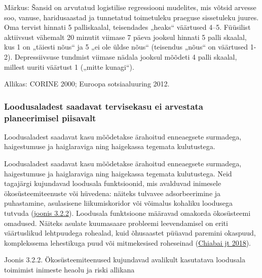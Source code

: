 \documentclass[estonian,]{article}
\begin{document}
\begin{figure-comment}
{Märkus:} Šansid on arvutatud logistilise regressiooni mudelites, mis
võtsid arvesse soo, vanuse, haridusaastad ja tunnetatud toimetuleku
praeguse sissetuleku juures. Oma tervist hinnati 5 palliskaalal,
teisendades „heaks`` väärtused 4--5. Füüsilist aktiivsust vähemalt 20
minutit viimase 7 päeva jooksul hinnati 5 palli skaalal, kus 1 on
„täiesti nõus`` ja 5 „ei ole üldse nõus`` (teisendus „nõus`` on
väärtused 1-2). Depressiivsuse tundmist viimase nädala jooksul mõõdeti 4
palli skaalal, millest uuriti väärtust 1 („mitte kunagi``).
\end{figure-comment}

\begin{imgsource}
{Allikas:} CORINE 2000; Euroopa sotsiaaluuring 2012.
\end{imgsource}

\hypertarget{loodusaladest-saadavat-tervisekasu-ei-arvestata-planeerimisel-piisavalt}{%
\subsubsection*{Loodusaladest saadavat tervisekasu ei arvestata planeerimisel piisavalt}\label{loodusaladest-saadavat-tervisekasu-ei-arvestata-planeerimisel-piisavalt}}

\begin{blockquote-left}
Loodusaladest saadavat kasu mõõdetakse ärahoitud enneaegsete surmadega,
haigestumuse ja haiglaraviga ning haigekassa tegemata kulutustega.
\end{blockquote-left}

Loodusaladest saadavat kasu mõõdetakse ärahoitud enneaegsete surmadega, haigestumuse ja haiglaraviga ning haigekassa tegemata kulutustega. Neid tagajärgi kujundavad loodusala funktsioonid, mis avalduvad inimesele ökosüsteemiteenuste või hüvedena: näiteks tulvavee adsorbeerimine ja puhastamine, asulasisene liikumiskoridor või võimalus kohaliku loodusega tutvuda (\protect\hyperlink{figure322}{joonis 3.2.2}). Loodusala funktsioone määravad omakorda ökosüsteemi omadused. Näiteks asulate kuumasaare probleemi leevendamisel on eriti väärtuslikud lehtpuudega rohealad, kuid õhusaastet püüavad paremini okaspuud, komplekssema lehestikuga puud või mitmekesised roheseinad (\protect\hyperlink{Chiabai2018}{Chiabai jt 2018}).

{Joonis 3.2.2.} Ökosüsteemiteenused kujundavad avalikult kasutatava loodusala toimimist inimeste heaolu ja riski allikana
\end{document}
